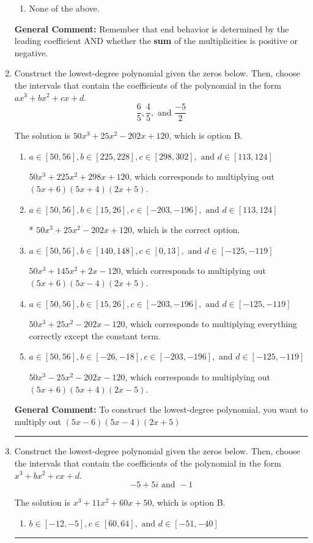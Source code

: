 \documentclass{extbook}[14pt]
\newcommand{\litem}[1]{\item #1

\rule{\textwidth}{0.4pt}}
\begin{document}
\begin{enumerate}
{\begin{enumerate}[label=\Alph*.]
\begin{multicols}{2}
\end{multicols}\item None of the above.\end{enumerate}
\textbf{General Comment:} Remember that end behavior is determined by the leading coefficient AND whether the \textbf{sum} of the multiplicities is positive or negative.
}
\litem{
Construct the lowest-degree polynomial given the zeros below. Then, choose the intervals that contain the coefficients of the polynomial in the form $ax^3+bx^2+cx+d$.
\[ \frac{6}{5}, \frac{4}{5}, \text{ and } \frac{-5}{2} \]

The solution is \( 50x^{3} +25 x^{2} -202 x + 120 \), which is option B.\begin{enumerate}[label=\Alph*.]
\item \( a \in [50, 56], b \in [225, 228], c \in [298, 302], \text{ and } d \in [113, 124] \)

$50x^{3} +225 x^{2} +298 x + 120$, which corresponds to multiplying out $(5x + 6)(5x + 4)(2x + 5)$.
\item \( a \in [50, 56], b \in [15, 26], c \in [-203, -196], \text{ and } d \in [113, 124] \)

* $50x^{3} +25 x^{2} -202 x + 120$, which is the correct option.
\item \( a \in [50, 56], b \in [140, 148], c \in [0, 13], \text{ and } d \in [-125, -119] \)

$50x^{3} +145 x^{2} +2 x -120$, which corresponds to multiplying out $(5x + 6)(5x -4)(2x + 5)$.
\item \( a \in [50, 56], b \in [15, 26], c \in [-203, -196], \text{ and } d \in [-125, -119] \)

$50x^{3} +25 x^{2} -202 x -120$, which corresponds to multiplying everything correctly except the constant term.
\item \( a \in [50, 56], b \in [-26, -18], c \in [-203, -196], \text{ and } d \in [-125, -119] \)

$50x^{3} -25 x^{2} -202 x -120$, which corresponds to multiplying out $(5x + 6)(5x + 4)(2x -5)$.
\end{enumerate}

\textbf{General Comment:} To construct the lowest-degree polynomial, you want to multiply out $(5x -6)(5x -4)(2x + 5)$
}
\litem{
Construct the lowest-degree polynomial given the zeros below. Then, choose the intervals that contain the coefficients of the polynomial in the form $x^3+bx^2+cx+d$.
\[ -5 + 5 i \text{ and } -1 \]

The solution is \( x^{3} +11 x^{2} +60 x + 50 \), which is option B.\begin{enumerate}[label=\Alph*.]
\item \( b \in [-12, -5], c \in [60, 64], \text{ and } d \in [-51, -40] \)


\end{enumerate}}
\end{enumerate}
\end{document}
